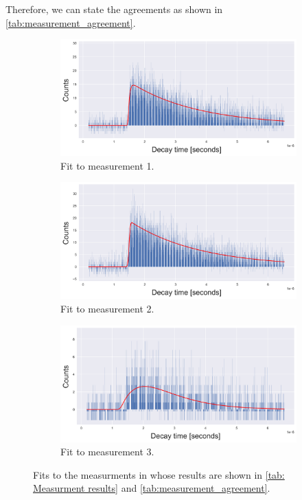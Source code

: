 \documentclass[11pt,a4paper]{article}
\begin{document}
Therefore, we can state the agreements as shown in \autoref{tab:measurement_agreement}.


\begin{figure}[h!]
\centering
\begin{subfigure}[t]{0.8\textwidth}
\centering
\includegraphics[width=\textwidth]{data_1.png}
\caption{Fit to measurement 1.}
\label{fig:data_1}
\end{subfigure}
\hfill
\begin{subfigure}[t]{0.8\textwidth}
    \centering
\includegraphics[width=\textwidth]{data_2.png}
\caption{Fit to measurement 2.}
\label{fig:data_2}
\end{subfigure}
\hfill
\begin{subfigure}[t]{0.8\textwidth}
    \centering
\includegraphics[width=\textwidth]{data_3.png}
\caption{Fit to measurement 3.}
\label{fig:data_3}
\end{subfigure}
\caption{Fits to the measurments in whose results are shown in \autoref{tab: Measurment results} and \autoref{tab:measurement_agreement}.}
\label{fig:data_fit}
\end{figure}
\end{document}
